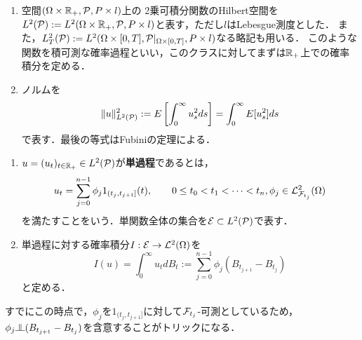 \documentclass[uplatex,dvipdfmx]{jsreport}
\begin{document}
\begin{notation}[確率積分を定義する過程のクラス]\mbox{}
    \begin{enumerate}
        \item 空間$(\Omega\times\mathbb{R}_+,\mathcal{P},P\times l)$上の
        2乗可積分関数のHilbert空間を$L^2(\mathcal{P}):=L^2(\Omega\times\mathbb{R}_+,\mathcal{P},P\times l)$と表す，ただし$l$はLebesgue測度とした．
        また，$L^2_T(\mathcal{P}):=L^2(\Omega\times[0,T],\mathcal{P}|_{\Omega\times[0,T]},P\times l)$なる略記も用いる．
        このような関数を積可測な確率過程といい，このクラスに対してまずは$\mathbb{R}_+$上での確率積分を定める．
        \item ノルムを
        \[\|u\|^2_{L^2(\mathcal{P})}:=E\left[\int^\infty_{0}u_s^2ds\right]=\int^\infty_0E[u^2_s]ds\]
        で表す．最後の等式はFubiniの定理による．
    \end{enumerate}
\end{notation}
\begin{Proof}
    
\end{Proof}

\begin{definition}\mbox{}
    \begin{enumerate}
        \item 
        $u=(u_t)_{t\in\mathbb{R}_+}\in L^2(\mathcal{P})$が\textbf{単過程}であるとは，
        \[u_t=\sum_{j=0}^{n-1}\phi_j1_{(t_j,t_{j+1}]}(t),\qquad 0\le t_0<t_1<\cdots<t_n,\phi_j\in\mathcal{L}^2_{\mathcal{F}_{t_j}}(\Omega)\]
        を満たすことをいう．単関数全体の集合を$\mathcal{E}\subset L^2(\mathcal{P})$で表す．
        \item 単過程に対する確率積分$I:\mathcal{E}\to\mathcal{L}^2(\Omega)$を
        \[I(u)=\int^\infty_0 u_tdB_t:=\sum^{n-1}_{j=0}\phi_j(B_{t_{j+1}}-B_{t_j})\]
        と定める．
    \end{enumerate}
\end{definition}
\begin{remarks}
    すでにこの時点で，$\phi_j$を$1_{(t_j,t_{j+1}]}$に対して$\mathcal{F}_{t_j}$-可測としているため，$\phi_j\indep (B_{t_{j+1}}-B_{t_j})$を含意することがトリックになる．
\end{remarks}
\end{document}
